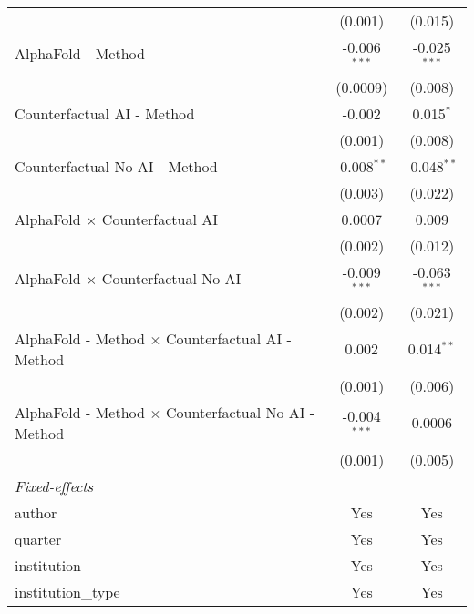 \begin{tabular}{lcc}
                                                              & (0.001)        & (0.015)\\   
   AlphaFold - Method                                         & -0.006$^{***}$ & -0.025$^{***}$\\   
                                                              & (0.0009)       & (0.008)\\   
   Counterfactual AI - Method                                 & -0.002         & 0.015$^{*}$\\   
                                                              & (0.001)        & (0.008)\\   
   Counterfactual No AI - Method                              & -0.008$^{**}$  & -0.048$^{**}$\\   
                                                              & (0.003)        & (0.022)\\   
   AlphaFold $\times$ Counterfactual AI                       & 0.0007         & 0.009\\   
                                                              & (0.002)        & (0.012)\\   
   AlphaFold $\times$ Counterfactual No AI                    & -0.009$^{***}$ & -0.063$^{***}$\\   
                                                              & (0.002)        & (0.021)\\   
   AlphaFold - Method $\times$ Counterfactual AI - Method     & 0.002          & 0.014$^{**}$\\   
                                                              & (0.001)        & (0.006)\\   
   AlphaFold - Method $\times$ Counterfactual No AI - Method  & -0.004$^{***}$ & 0.0006\\   
                                                              & (0.001)        & (0.005)\\   
   \midrule
   \emph{Fixed-effects}\\
   author                                                     & Yes            & Yes\\  
   quarter                                                    & Yes            & Yes\\  
   institution                                                & Yes            & Yes\\  
   institution\_type                                          & Yes            & Yes\\  

\end{tabular}
